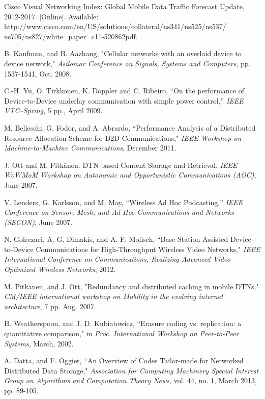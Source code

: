 \documentclass[10pt,conference]{IEEEtran}
\begin{document}
\begin{thebibliography}{1}

Cisco Visual Networking Index: Global Mobile Data Traffic Forecast Update, 2012-2017. [Online]. Available: http://www.cisco.com/en/US/solutions/collateral/ns341/ns525/ns537/\\ns705/ns827/white\_paper\_c11-520862pdf.

 B. Kaufman, and B. Aazhang, "Cellular networks with an overlaid device to device network," \emph{Asilomar Conference on Signals, Systems and Computers}, pp. 1537-1541, Oct. 2008.

C.-H. Yu, O. Tirkkonen, K. Doppler and C. Ribeiro, ``On the
performance of Device-to-Device underlay communication with simple
power control,'' \emph{IEEE VTC--Spring}, 5 pp., April 2009.

M. Belleschi, G. Fodor, and A. Abrardo, ``Performance Analysis of a Distributed Resource Allocation Scheme for D2D Communications,"
\emph{IEEE Workshop on Machine-to-Machine Communications}, December 2011.

 J. Ott and M. Pitk\"anen. DTN-based Content Storage
  and Retrieval. \emph{IEEE WoWMoM Workshop on Autonomic and
    Opportunistic Communications (AOC)}, June 2007.

 V. Lenders, G. Karlsson, and M. May, ``Wireless
  Ad Hoc Podcasting,'' \emph{IEEE Conference on Sensor, Mesh, and Ad
    Hoc Communications and Networks (SECON)}, June 2007.

N. Golrezaei, A. G. Dimakis, and A. F. Molisch, ``Base Station Assisted Device-to-Device Communications for High-Throughput Wireless Video Networks,"
\emph{IEEE International Conference on Communications, Realizing
  Advanced Video Optimized Wireless Networks}, 2012.

 M. Pitk\"anen, and J. Ott, "Redundancy and distributed
  caching in mobile DTNs," \emph{CM/IEEE international workshop on Mobility in the evolving internet architecture}, 7 pp. Aug. 2007. 

H. Weatherspoon, and J. D. Kubiatowicz, ``Erasure coding vs. replication: a quantitative comparison,"
in \emph{Proc. International Workshop on Peer-to-Peer Systems}, March, 2002.

A. Datta, and F. Oggier, ``An Overview of Codes Tailor-made for Networked Distributed Data Storage,"
\emph{Association for Computing Machinery Special Interest Group on Algorithms and Computation Theory News}, vol. 44, no. 1, March 2013, pp. 89-105.


\end{thebibliography}
\end{document}
